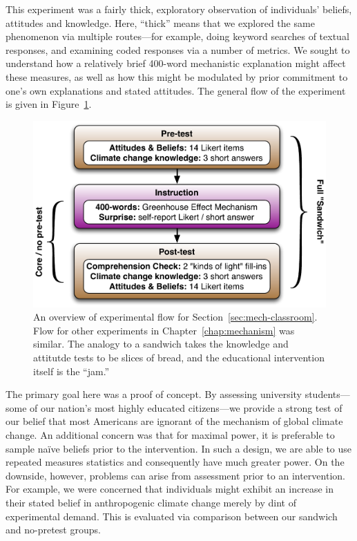 This experiment was a fairly thick, exploratory observation of individuals'
beliefs, attitudes and knowledge. Here, “thick” means that we explored the same
phenomenon via multiple routes---for example, doing keyword searches of textual
responses, and examining coded responses via a number of metrics. We sought to
understand how a relatively brief 400-word mechanistic explanation might affect
these measures, as well as how this might be modulated by prior commitment to
one's own explanations and stated attitudes.  The general flow of the experiment
is given in Figure~\ref{fig:mech-flow}.

\begin{figure}[h]
    \includegraphics[width=6.5in]{mech-survey-flow1.pdf}
    \caption{An overview of experimental flow for
        Section~\ref{sec:mech-classroom}. Flow for other experiments in
        Chapter~\ref{chap:mechanism} was similar. The analogy to a sandwich
        takes the knowledge and attitutde tests to be slices of bread, and the
        educational intervention itself is the “jam.”}
    \label{fig:mech-flow}
\end{figure}

The primary goal here was a proof of concept. By assessing university
students---some of our nation’s most highly educated citizens---we provide a
strong test of our belief that most Americans are ignorant of the mechanism of
global climate change. An additional concern was that for maximal power, it is
preferable to sample na\"ive beliefs prior to the intervention. In such a
design, we are able to use repeated measures statistics and consequently have
much greater power. On the downside, however, problems can arise from assessment
prior to an intervention. For example, we were concerned that individuals might
exhibit an increase in their stated belief in anthropogenic climate change
merely by dint of experimental demand. This is evaluated via comparison between
our sandwich and no-pretest groups.

